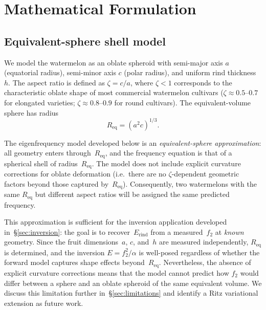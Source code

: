 \section{Mathematical Formulation}
\label{sec:formulation}

\subsection{Equivalent-sphere shell model}
\label{sec:geometry}

We model the watermelon as an oblate spheroid with semi-major axis $a$
(equatorial radius), semi-minor axis $c$ (polar radius), and uniform
rind thickness $h$.  The aspect ratio is defined as
$\zeta = c/a$,
where $\zeta < 1$ corresponds to the characteristic oblate shape of most
commercial watermelon cultivars ($\zeta \approx 0.5$--$0.7$ for
elongated varieties; $\zeta \approx 0.8$--$0.9$ for round cultivars).
The equivalent-volume sphere has radius
\begin{equation}
  R_{\mathrm{eq}} = \left( a^2 c \right)^{1/3}.
  \label{eq:Req}
\end{equation}

\noindent
The eigenfrequency model developed below is an \emph{equivalent-sphere
approximation}: all geometry enters through~$R_{\mathrm{eq}}$, and the
frequency equation is that of a spherical shell of
radius~$R_{\mathrm{eq}}$.  The model does not include explicit
curvature corrections for oblate deformation (i.e.\ there are no
$\zeta$-dependent geometric factors beyond those captured
by~$R_{\mathrm{eq}}$).  Consequently, two watermelons with the same
$R_{\mathrm{eq}}$ but different aspect ratios will be assigned the
same predicted frequency.

This approximation is sufficient for the inversion application developed
in~\S\ref{sec:inversion}: the goal is to recover~$E_{\mathrm{rind}}$
from a measured~$f_2$ at \emph{known} geometry.  Since the fruit
dimensions~$a$, $c$, and~$h$ are measured independently,
$R_{\mathrm{eq}}$ is determined, and the inversion
$E = f_2^2 / \alpha$ is well-posed regardless of whether the forward
model captures shape effects beyond~$R_{\mathrm{eq}}$.  Nevertheless,
the absence of explicit curvature corrections means that the model
cannot predict how $f_2$ would differ between a sphere and an oblate
spheroid of the same equivalent volume.  We discuss this limitation
further in~\S\ref{sec:limitations} and identify a Ritz variational
extension as future work.

